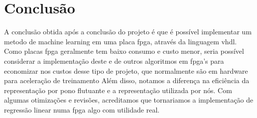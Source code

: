 \section{Conclusão}

A conclusão obtida após a conclusão do projeto é que é possível implementar um metodo de machine learning em uma placa fpga, através da linguagem vhdl. Como placas fpga geralmente tem baixo consumo e custo menor, seria possível considerar a implementação deste e de outros algoritmos em fpga's para economizar nos custos desse tipo de projeto, que normalmente são em hardware para aceleração de treinamento
Além disso, notamos a diferença na eficiência da representação por pono flutuante e a representação utilizada por nós. Com algumas otimizações e revisões, acreditamos que tornariamos a implementação de regressão linear numa fpga algo com utilidade real.
